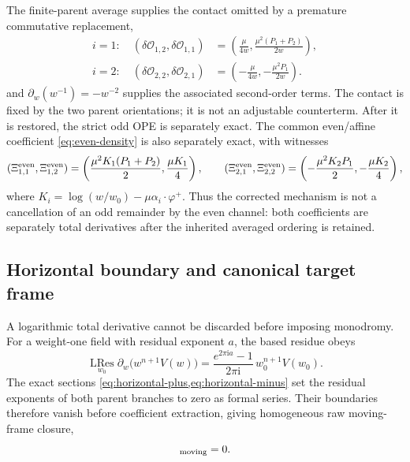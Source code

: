 \documentclass[11pt,a4paper]{article}
\numberwithin{equation}{section}
\theoremstyle{remark}
\newcommand{\LRes}{\operatorname*{LRes}}
\newcommand{\ii}{\mathrm{i}}
\newcommand{\cU}{\mathcal U}
\begin{document}
The finite-parent average supplies the contact omitted by a premature commutative
replacement,
\begin{align}
 i=1:\quad
 (\delta\mathcal O_{1,2},\delta\mathcal O_{1,1})
 &=\left(\frac{\mu}{4w},\frac{\mu^2(P_1+P_2)}{2w}\right),
 \nonumber\\[1mm]
 i=2:\quad
 (\delta\mathcal O_{2,2},\delta\mathcal O_{2,1})
 &=\left(-\frac{\mu}{4w},-\frac{\mu^2P_1}{2w}\right).
 \label{eq:ordering-contact}
\end{align}
and $\partial_w(w^{-1})=-w^{-2}$ supplies the associated second-order terms.  The contact is
fixed by the two parent orientations; it is not an adjustable counterterm.  After it is restored,
the strict odd OPE is separately exact.  The common even/affine coefficient
\cref{eq:even-density} is also separately exact, with witnesses
\begin{equation}
 (\Xi_{1,1}^{\rm even},\Xi_{1,2}^{\rm even})
 =\left(\frac{\mu^2K_1(P_1+P_2)}2,\frac{\mu K_1}{4}\right),
 \qquad
 (\Xi_{2,1}^{\rm even},\Xi_{2,2}^{\rm even})
 =\left(-\frac{\mu^2K_2P_1}{2},-\frac{\mu K_2}{4}\right),
 \label{eq:even-witnesses}
\end{equation}
where $K_i=\log(w/w_0)-\mu\alpha_i\cdot\varphi^+$.  Thus the corrected mechanism is
not a cancellation of an odd remainder by the even channel: both coefficients are separately
total derivatives after the inherited averaged ordering is retained.

\subsection{Horizontal boundary and canonical target frame}

A logarithmic total derivative cannot be discarded before imposing monodromy.  For a
weight-one field with residual exponent $a$, the based residue obeys
\begin{equation}
 \LRes_{w_0}\partial_w\bigl(w^{n+1}V(w)\bigr)
 =\frac{e^{2\pi\ii a}-1}{2\pi\ii}\,w_0^{n+1}V(w_0).
 \label{eq:based-boundary}
\end{equation}
The exact sections \cref{eq:horizontal-plus,eq:horizontal-minus} set the residual exponents of
both parent branches to zero as formal series.  Their boundaries therefore vanish before
coefficient extraction, giving homogeneous raw moving-frame closure,
\begin{equation}
 [\widetilde Q_i^{[1]},\cU_{3,n}^{\sigma,[0]}]_{\rm moving}=0.
 \label{eq:raw-closure}
\end{equation}
\end{document}
